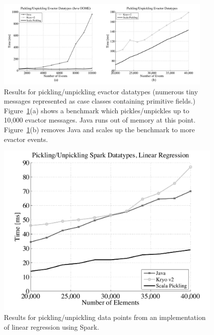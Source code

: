 \documentclass[10pt]{sigplanconf}
\theoremstyle{definition}
\theoremstyle{definition}
\begin{document}

\begin{figure}[ht!]
 \centering
 \includegraphics[width=0.95\textwidth]{evactor.pdf}
 \caption{Results for pickling/unpickling evactor datatypes (numerous tiny messages represented as case classes containing primitive fields.) Figure~\ref{fig:evactor}(a) shows a benchmark which pickles/unpickles up to 10,000 evactor messages. Java runs out of memory at this point. Figure~\ref{fig:evactor}(b) removes Java and scales up the benchmark to more evactor events.}
 \label{fig:evactor}
\end{figure}

\begin{figure}[ht!]
 \centering
 \includegraphics[width=\columnwidth]{sparklr.pdf}
 \caption{Results for pickling/unpickling data points from an implementation of linear regression using Spark.}
 \label{fig:spark}
\end{figure}
\end{document}
